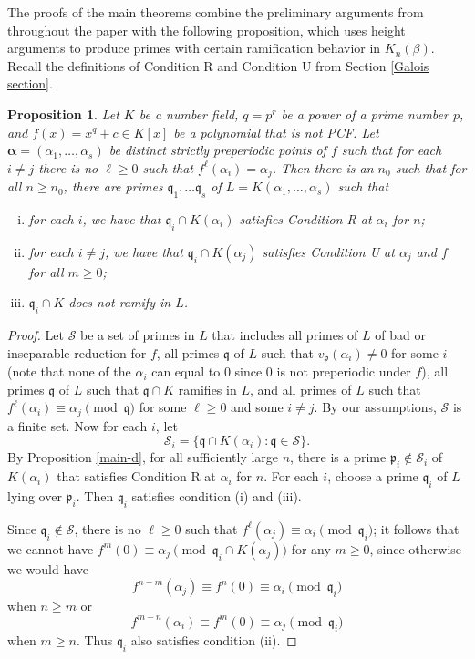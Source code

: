 \documentclass[11pt]{amsart}
\newtheorem{prop}[thm]{Proposition}
\theoremstyle{definition}
\theoremstyle{definition}
\numberwithin{thm}{section}
\numberwithin{equation}{thm}
\newcommand{\fp}{\ensuremath{{\mathfrak{p}}}}
\newcommand{\fq}{\ensuremath{{\mathfrak{q}}}}
\newcommand{\cS}{\mathcal S}
\newcommand{\ba}{{\boldsymbol \alpha}}
\begin{document}
The proofs of the main theorems combine the preliminary arguments from 
throughout the paper with the following proposition, which uses height arguments to 
produce primes with certain ramification behavior in $K_n(\beta)$. 
Recall the definitions of Condition R and Condition U from Section \ref{Galois section}.
\begin{prop}\label{final prop}
  Let $K$ be a number field, $q = p^r$ be a power of a prime
  number $p$, and $f(x) = x^q + c \in K[x]$ be a
  polynomial that is not PCF. Let $\ba=(\alpha_1, \dots, \alpha_s)$ be distinct
  strictly preperiodic points of $f$ such that for each $i \ne j$
  there is no $\ell \geq 0$ such that $f^{\ell}(\alpha_i) = \alpha_j$.
  Then there is an $n_0$ such that for all $n \geq n_0$, there are
  primes $\fq_1, \dots \fq_s$ of $L=K(\alpha_1,\dots,\alpha_s)$ such that
\begin{enumerate}[(i)]
\item for each $i$, we have that $\fq_i \cap K(\alpha_i)$
satisfies Condition R at
$\alpha_i$ for $n$;
\item for each $i\ne j$, we have that $\fq_i \cap K(\alpha_j)$
satisfies Condition U at $\alpha_j$ and $f$ for all $m \geq 0$;
\item $\fq_i \cap K$ does not ramify in $L$.   
\end{enumerate}
\end{prop}
\begin{proof}
  Let $\cS$ be a set of primes in $L$ that includes all primes of $L$ of
  bad or inseparable reduction for $f$, all primes $\fq$ of $L$ such that
  $v_\fp(\alpha_i) \ne 0$ for some $i$ (note that none of the $\alpha_i$
  can equal to 0 since 0 is not preperiodic under $f$), all primes $\fq$
  of $L$ such that $\fq \cap K$ ramifies in $L$, and all primes of $L$
  such that $f^\ell(\alpha_i) \equiv \alpha_j \pmod{\fq}$ for some
  $\ell \geq 0$ and some $i \ne j$.
  By our assumptions, $\cS$ is a finite set.
  Now for each $i$, let \[\cS_i = \{\fq \cap K(\alpha_i):\fq\in \cS\}.\]
  By Proposition \ref{main-d}, for all sufficiently large $n$,
  there is a prime $\fp_i \notin \cS_i$ of $K(\alpha_i)$
  that satisfies Condition R at $\alpha_i$ for $n$.
  For each $i$, choose a prime $\fq_i$ of $L$ lying over $\fp_i$.
  Then $\fq_i$ satisfies condition (i) and (iii).
  
  Since $\fq_i \notin \cS$,
  there is no $\ell \ge 0$ such that
  $f^\ell(\alpha_j) \equiv \alpha_i \pmod {\fq_i}$; it follows that we
  cannot have $f^m(0) \equiv \alpha_j \pmod{\fq_i \cap K(\alpha_j)}$
  for any $m\geq 0$, since otherwise we would have
  \[f^{n-m}(\alpha_j) \equiv f^n(0) \equiv \alpha_i \pmod{\fq_i}\]
  when $n\geq m$ or
  \[f^{m-n}(\alpha_i) \equiv f^m(0) \equiv \alpha_j \pmod{\fq_i}\]
  when $m \geq n$.
  Thus $\fq_i$ also satisfies condition (ii).
\end{proof}
\end{document}
